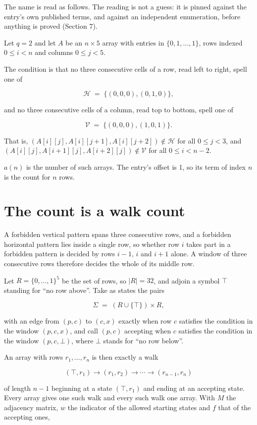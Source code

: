 \documentclass[11pt]{article}
\theoremstyle{definition}
\begin{document}
The name is read as follows. The reading is not a guess: it is pinned against the entry's own published terms, and against an independent enumeration, before anything is proved (Section 7).

Let $q = 2$ and let $A$ be an $n \times 5$ array with entries in $\{0,1,\dots,1\}$, rows indexed $0 \le i < n$ and columns $0 \le j < 5$.

The condition is that no three consecutive cells of a row, read left to right, spell one of

\[\mathcal{H} \;=\; \{(0,0,0), (0,1,0)\},\]

and no three consecutive cells of a column, read top to bottom, spell one of

\[\mathcal{V} \;=\; \{(0,0,0), (1,0,1)\}.\]

That is, $(A[i][j],A[i][j{+}1],A[i][j{+}2]) \notin \mathcal{H}$ for all $0 \le j < 3$, and $(A[i][j],A[i{+}1][j],A[i{+}2][j]) \notin \mathcal{V}$ for all $0 \le i < n-2$.

$a(n)$ is the number of such arrays. The entry's offset is 1, so its term of index $n$ is the count for $n$ rows.

\section{The count is a walk count}

A forbidden vertical pattern spans three consecutive rows, and a forbidden horizontal pattern lies inside a single row, so whether row $i$ takes part in a forbidden pattern is decided by rows $i-1$, $i$ and $i+1$ alone. A window of three consecutive rows therefore decides the whole of its middle row.

Let $R = \{0,\dots,1\}^{5}$ be the set of rows, so $|R| = 32$, and adjoin a symbol $\top$ standing for ``no row above''. Take as states the pairs

\[\Sigma \;=\; (R \cup \{\top\}) \times R,\]

with an edge from $(p,c)$ to $(c,x)$ exactly when row $c$ satisfies the condition in the window $(p,c,x)$, and call $(p,c)$ accepting when $c$ satisfies the condition in the window $(p,c,\bot)$, where $\bot$ stands for ``no row below''.

An array with rows $r_1,\dots,r_n$ is then exactly a walk

\[(\top,r_1) \to (r_1,r_2) \to \cdots \to (r_{n-1},r_n)\]

of length $n-1$ beginning at a state $(\top,r_1)$ and ending at an accepting state. Every array gives one such walk and every such walk one array. With $M$ the adjacency matrix, $w$ the indicator of the allowed starting states and $f$ that of the accepting ones,
\end{document}
